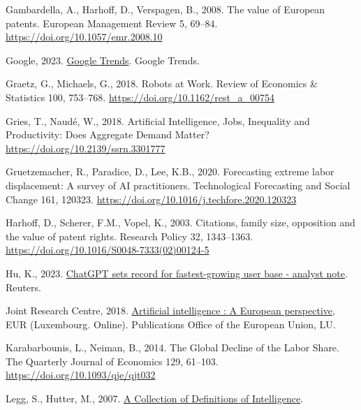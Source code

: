 \documentclass[
  12pt,
  a4paperpaper,
]{article}
\newlength{\cslhangindent}
\newenvironment{CSLReferences}[2] %
 {\begin{list}{}{%
  \setlength{\itemindent}{0pt}
  \setlength{\leftmargin}{0pt}
  \setlength{\parsep}{0pt}
  \ifodd #1
   \setlength{\leftmargin}{\cslhangindent}
   \setlength{\itemindent}{-1\cslhangindent}
  \fi
  \setlength{\itemsep}{#2\baselineskip}}}
 {\end{list}}
\begin{document}
\begin{CSLReferences}{1}{0}
Gambardella, A., Harhoff, D., Verspagen, B., 2008. The value of
{European} patents. European Management Review 5, 69--84.
\url{https://doi.org/10.1057/emr.2008.10}

Google, 2023.
\href{https://trends.google.com/trends/explore?date=all&q=AI&hl=en}{Google
{Trends}}. Google Trends.

Graetz, G., Michaels, G., 2018. Robots at {Work}. Review of Economics \&
Statistics 100, 753--768. \url{https://doi.org/10.1162/rest_a_00754}

Gries, T., Naudé, W., 2018. Artificial {Intelligence}, {Jobs},
{Inequality} and {Productivity}: {Does} {Aggregate} {Demand} {Matter}?
\url{https://doi.org/10.2139/ssrn.3301777}

Gruetzemacher, R., Paradice, D., Lee, K.B., 2020. Forecasting extreme
labor displacement: {A} survey of {AI} practitioners. Technological
Forecasting and Social Change 161, 120323.
\url{https://doi.org/10.1016/j.techfore.2020.120323}

Harhoff, D., Scherer, F.M., Vopel, K., 2003. Citations, family size,
opposition and the value of patent rights. Research Policy 32,
1343--1363. \url{https://doi.org/10.1016/S0048-7333(02)00124-5}

Hu, K., 2023.
\href{https://www.reuters.com/technology/chatgpt-sets-record-fastest-growing-user-base-analyst-note-2023-02-01/}{{ChatGPT}
sets record for fastest-growing user base - analyst note}. Reuters.

Joint Research Centre, 2018.
\href{https://data.europa.eu/doi/10.2760/11251}{Artificial intelligence
: A {European} perspective}, {EUR} ({Luxembourg}. {Online}).
Publications Office of the European Union, LU.

Karabarbounis, L., Neiman, B., 2014. The {Global} {Decline} of the
{Labor} {Share}. The Quarterly Journal of Economics 129, 61--103.
\url{https://doi.org/10.1093/qje/qjt032}

Legg, S., Hutter, M., 2007. \href{http://arxiv.org/abs/0706.3639}{A
{Collection} of {Definitions} of {Intelligence}}.


\end{CSLReferences}
\end{document}
